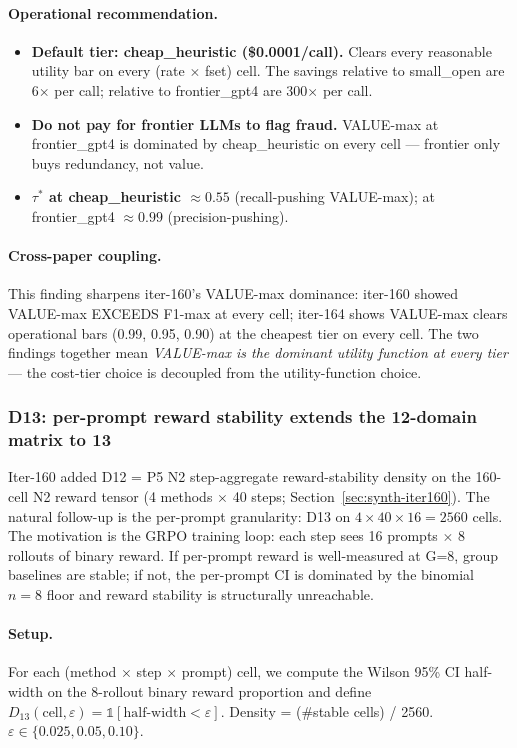 \documentclass{article}
\providecommand{\secref}[1]{Section~\ref{#1}}
\begin{document}
\paragraph{Operational recommendation.}
\begin{itemize}
\item \textbf{Default tier: cheap\_heuristic (\$0.0001/call).} Clears
every reasonable utility bar on every (rate $\times$ fset) cell. The
savings relative to small\_open are 6$\times$ per call; relative to
frontier\_gpt4 are 300$\times$ per call.
\item \textbf{Do not pay for frontier LLMs to flag fraud.} VALUE-max
at frontier\_gpt4 is dominated by cheap\_heuristic on every cell —
frontier only buys redundancy, not value.
\item \textbf{$\tau^*$ at cheap\_heuristic $\approx 0.55$} (recall-pushing
VALUE-max); at frontier\_gpt4 $\approx 0.99$ (precision-pushing).
\end{itemize}

\paragraph{Cross-paper coupling.}
This finding sharpens iter-160's VALUE-max dominance: iter-160 showed
VALUE-max EXCEEDS F1-max at every cell; iter-164 shows VALUE-max clears
operational bars (0.99, 0.95, 0.90) at the cheapest tier on every cell.
The two findings together mean \emph{VALUE-max is the dominant utility
function at every tier} — the cost-tier choice is decoupled from the
utility-function choice. 

\subsubsection{D13: per-prompt reward stability extends the 12-domain matrix to 13}
\label{sec:synth-iter164-d13}

Iter-160 added D12 = P5 N2 step-aggregate reward-stability density on
the 160-cell N2 reward tensor (4 methods $\times$ 40 steps;
\secref{sec:synth-iter160}). The natural follow-up is the per-prompt
granularity: D13 on $4 \times 40 \times 16 = 2560$ cells. The motivation
is the GRPO training loop: each step sees 16 prompts $\times$ 8 rollouts
of binary reward. If per-prompt reward is well-measured at G=8, group
baselines are stable; if not, the per-prompt CI is dominated by the
binomial $n=8$ floor and reward stability is structurally unreachable.

\paragraph{Setup.}
For each (method $\times$ step $\times$ prompt) cell, we compute the
Wilson 95\% CI half-width on the 8-rollout binary reward proportion
and define $D_{13}(\mathrm{cell}, \varepsilon) = \mathbb{1}[\mathrm{half\text{-}width} < \varepsilon]$.
Density = (\#stable cells) / 2560.
$\varepsilon \in \{0.025, 0.05, 0.10\}$.
\end{document}
